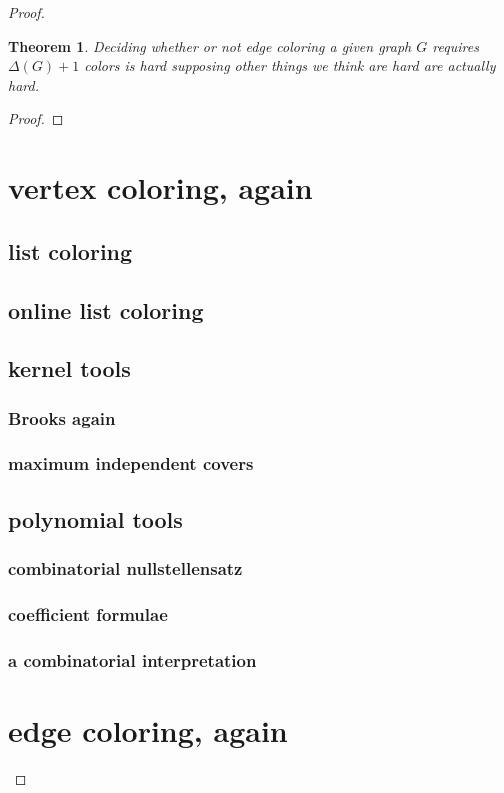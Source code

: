 \documentclass{amsbook}
\theoremstyle{plain}
\newtheorem{theorem}{Theorem}
\numberwithin{equation}{chapter}
\begin{document}
\begin{proof}
\begin{theorem}\label{HolyerEdgeColoringDecisionIsHard}
Deciding whether or not edge coloring a given graph $G$ requires $\Delta(G) + 1$ colors is hard supposing other things we think are hard are actually hard.
\end{theorem}
\begin{proof}
\end{proof}

\chapter*{vertex coloring, again}
\section*{list coloring}
\section*{online list coloring}
\section*{kernel tools}
\subsection*{Brooks again}
\subsection*{maximum independent covers}
\section*{polynomial tools}
\subsection*{combinatorial nullstellensatz}
\subsection*{coefficient formulae}
\subsection*{a combinatorial interpretation}

\chapter*{edge coloring, again}

\end{proof}
\end{document}
